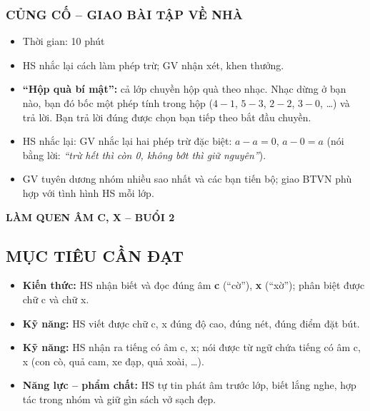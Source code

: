 \documentclass[../main.tex]{subfiles}
\begin{document}
\subsubsection{CỦNG CỐ -- GIAO BÀI TẬP VỀ NHÀ}
\begin{hd}
    \begin{itemize}
        \item Thời gian: 10 phút
        \item HS nhắc lại cách làm phép trừ; GV nhận xét, khen thưởng.
    \end{itemize}
\end{hd}
\begin{itemize}
    \item \textbf{“Hộp quà bí mật”:} cả lớp chuyền hộp quà theo nhạc. Nhạc dừng ở bạn nào, bạn đó bốc một phép tính trong hộp ($4 - 1$, $5 - 3$, $2 - 2$, $3 - 0$, \dots) và trả lời. Bạn trả lời đúng được chọn bạn tiếp theo bắt đầu chuyền.
    \item HS nhắc lại:  GV nhắc lại hai phép trừ đặc biệt: $a - a = 0$, $a - 0 = a$ (nói bằng lời: \textit{“trừ hết thì còn 0, không bớt thì giữ nguyên”}).
    \item GV tuyên dương nhóm nhiều sao nhất và các bạn tiến bộ; giao BTVN phù hợp với tình hình HS mỗi lớp.
\end{itemize}

\newpage
{}
\par\medskip
\begin{center}
        {\color{mauchinh!120}\bfseries\Large LÀM QUEN ÂM C, X -- BUỔI 2}
\end{center}

\subsection{MỤC TIÊU CẦN ĐẠT}
\begin{itemize}
    \item \textbf{Kiến thức:} HS nhận biết và đọc đúng âm \textbf{c} (“cờ”), \textbf{x} (“xờ”); phân biệt được chữ c và chữ x.
    \item \textbf{Kỹ năng:} HS viết được chữ c, x đúng độ cao, đúng nét, đúng điểm đặt bút.
    \item \textbf{Kỹ năng:} HS nhận ra tiếng có âm c, x; nói được từ ngữ chứa tiếng có âm c, x (con cò, quả cam, xe đạp, quả xoài, \dots).
    \item \textbf{Năng lực -- phẩm chất:} HS tự tin phát âm trước lớp, biết lắng nghe, hợp tác trong nhóm và giữ gìn sách vở sạch đẹp.
\end{itemize}
\end{document}
